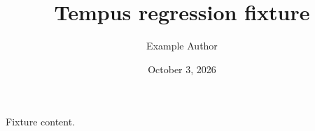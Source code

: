 \documentclass[nobanner]{tempusreport}
\title{Tempus regression fixture}
\author{Example Author}\date{October 3, 2026}
\begin{document}
\maketitle
Fixture content.
\end{document}

